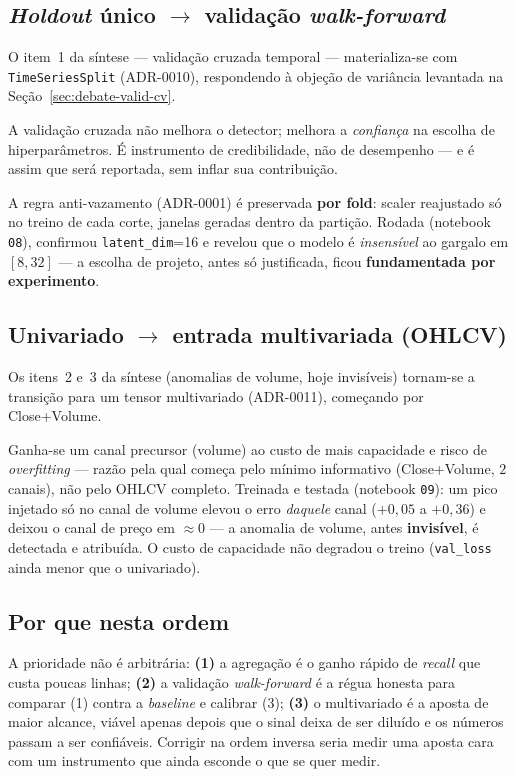 \subsection{\emph{Holdout} único $\to$ validação \emph{walk-forward}}
\label{sec:debate-fase2-cv}
O item~1 da síntese --- validação cruzada temporal --- materializa-se com \texttt{TimeSeriesSplit}
(ADR-0010), respondendo à objeção de variância levantada na Seção~\ref{sec:debate-valid-cv}.
\begin{honesto}
A validação cruzada não melhora o detector; melhora a \emph{confiança} na escolha de
hiperparâmetros. É instrumento de credibilidade, não de desempenho --- e é assim que será
reportada, sem inflar sua contribuição.
\end{honesto}
A regra anti-vazamento (ADR-0001) é preservada \textbf{por fold}: scaler reajustado só no treino
de cada corte, janelas geradas dentro da partição. Rodada (notebook \texttt{08}), confirmou
\texttt{latent\_dim}=16 e revelou que o modelo é \emph{insensível} ao gargalo em $[8,32]$ --- a
escolha de projeto, antes só justificada, ficou \textbf{fundamentada por experimento}.

\subsection{Univariado $\to$ entrada multivariada (OHLCV)}
\label{sec:debate-fase2-multi}
Os itens~2 e~3 da síntese (anomalias de volume, hoje invisíveis) tornam-se a transição para um
tensor multivariado (ADR-0011), começando por Close+Volume.
\begin{tradeoff}
Ganha-se um canal precursor (volume) ao custo de mais capacidade e risco de \emph{overfitting}
--- razão pela qual começa pelo mínimo informativo (Close+Volume, $2$ canais), não pelo OHLCV
completo. Treinada e testada (notebook \texttt{09}): um pico injetado só no canal de volume
elevou o erro \emph{daquele} canal ($+0{,}05$ a $+0{,}36$) e deixou o canal de preço em
$\approx 0$ --- a anomalia de volume, antes \textbf{invisível}, é detectada e atribuída. O custo
de capacidade não degradou o treino (\texttt{val\_loss} ainda menor que o univariado).
\end{tradeoff}

\subsection{Por que nesta ordem}
\label{sec:debate-fase2-ordem}
A prioridade não é arbitrária: \textbf{(1)} a agregação é o ganho rápido de \emph{recall} que
custa poucas linhas; \textbf{(2)} a validação \emph{walk-forward} é a régua honesta para
comparar (1) contra a \emph{baseline} e calibrar (3); \textbf{(3)} o multivariado é a aposta de
maior alcance, viável apenas depois que o sinal deixa de ser diluído e os números passam a ser
confiáveis. Corrigir na ordem inversa seria medir uma aposta cara com um instrumento que ainda
esconde o que se quer medir.

